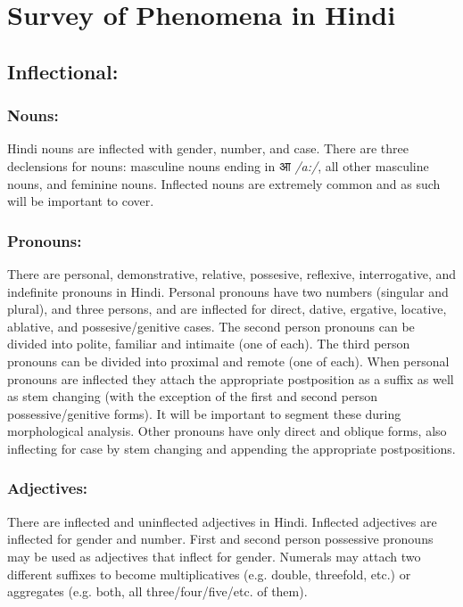 \documentclass[11pt,letterpaper]{article}
\begin{document}
\section{Survey of Phenomena in Hindi}
\subsection{Inflectional:}
\subsubsection{Nouns:}
Hindi nouns are inflected with gender, number, and case. There are three declensions for nouns: masculine nouns ending in आ \emph{/a:/}, all other masculine nouns, and feminine nouns. Inflected nouns are extremely common and as such will be important to cover.
\subsubsection{Pronouns:}
There are personal, demonstrative, relative, possesive, reflexive, interrogative, and indefinite pronouns in Hindi. 
Personal pronouns have two numbers (singular and plural), and three persons, and are inflected for direct, dative, ergative, locative, ablative, and possesive/genitive cases. The second person pronouns can be divided into polite, familiar and intimaite (one of each). The third person pronouns can be divided into proximal and remote (one of each). When personal pronouns are inflected they attach the appropriate postposition as a suffix as well as stem changing (with the exception of the first and second person possessive/genitive forms). It will be important to segment these during morphological analysis.
Other pronouns have only direct and oblique forms, also inflecting for case by stem changing and appending the appropriate postpositions.
\subsubsection{Adjectives:}
There are inflected and uninflected adjectives in Hindi. Inflected adjectives are inflected for gender and number. First and second person possessive pronouns may be used as adjectives that inflect for gender. Numerals may attach two different suffixes to become multiplicatives (e.g. double, threefold, etc.) or aggregates (e.g. both, all three/four/five/etc. of them).
\end{document}
